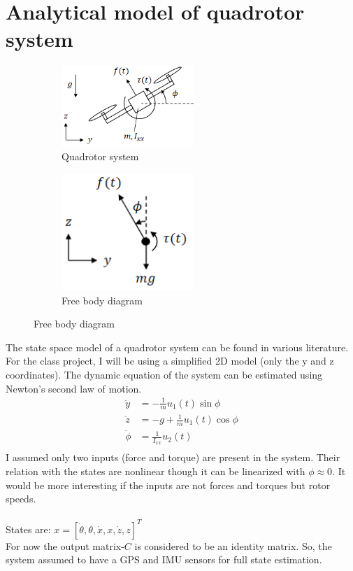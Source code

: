 \documentclass[12pt]{article}
\begin{document}
\section*{Analytical model of quadrotor system}
\begin{figure}[h!]
    \begin{subfigure}[t]{0.5\textwidth}
        \centering
        \includegraphics[width=5cm]{figures/model_diagram.png}
        \caption{Quadrotor system \cite{model_diagram}}
        \label{fig:01}
    \end{subfigure}
    \hfill
    \begin{subfigure}[t]{0.5\textwidth}
        \centering
        \includegraphics[width=5cm]{figures/free_body_diagram.png}
        \caption{Free body diagram \cite{model_diagram}}
        \label{fig:02}
    \end{subfigure}
\end{figure}

The state space model of a quadrotor system can be found in various literature\cite{K2019}\cite{Schreier2012}. For the class project, I will be using a simplified 2D model (only the y and z coordinates). The dynamic equation of the system can be estimated using Newton's second law of motion.
\begin{align*}
    \ddot{y} &= -\frac{1}{m}u_1(t) \sin{\phi} \\
    \ddot{z} &= -g + \frac{1}{m}u_1(t) \cos{\phi} \\ 
    \ddot{\phi} &= \frac{1}{I_{xx}}u_2(t) \\
\end{align*}
I assumed only two inputs (force and torque) are present in the system. Their relation with the states are nonlinear though it can be linearized with $\phi \approx 0$. It would be more interesting if the inputs are not forces and torques but rotor speeds. \\\\
States are: $x = [\dot{\theta}, \theta, \dot{x}, x, \dot{z}, z]^T$ \\
For now the output matrix-$C$ is considered to be an identity matrix. So, the system assumed to have a GPS and IMU sensors for full state estimation.
\end{document}
